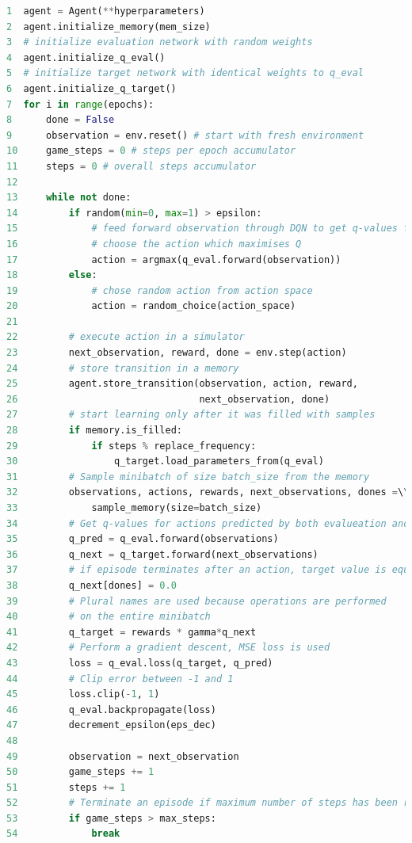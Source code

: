 \begin{lstlisting}[language=Python, caption={Main algorithm loop}]
1  agent = Agent(**hyperparameters)
2  agent.initialize_memory(mem_size)
3  # initialize evaluation network with random weights
4  agent.initialize_q_eval()
5  # initialize target network with identical weights to q_eval
6  agent.initialize_q_target()
7  for i in range(epochs):
8      done = False
9      observation = env.reset() # start with fresh environment
10     game_steps = 0 # steps per epoch accumulator
11     steps = 0 # overall steps accumulator
12        
13     while not done:
14         if random(min=0, max=1) > epsilon:
15             # feed forward observation through DQN to get q-values for each action
16             # choose the action which maximises Q
17             action = argmax(q_eval.forward(observation))
18         else:
19             # chose random action from action space
20             action = random_choice(action_space)
21            
22         # execute action in a simulator
23         next_observation, reward, done = env.step(action)
24         # store transition in a memory
25         agent.store_transition(observation, action, reward,
26                                next_observation, done)
27         # start learning only after it was filled with samples
28         if memory.is_filled:
29             if steps % replace_frequency:
30                 q_target.load_parameters_from(q_eval)
31         # Sample minibatch of size batch_size from the memory
32         observations, actions, rewards, next_observations, dones =\\
33             sample_memory(size=batch_size)
34         # Get q-values for actions predicted by both evalueation and target network
35         q_pred = q_eval.forward(observations)
36         q_next = q_target.forward(next_observations)
37         # if episode terminates after an action, target value is equal only to reward
38         q_next[dones] = 0.0
39         # Plural names are used because operations are performed 
40         # on the entire minibatch
41         q_target = rewards * gamma*q_next
42         # Perform a gradient descent, MSE loss is used
43         loss = q_eval.loss(q_target, q_pred)
44         # Clip error between -1 and 1
45         loss.clip(-1, 1)
46         q_eval.backpropagate(loss)
47         decrement_epsilon(eps_dec)
48              
49         observation = next_observation
50         game_steps += 1
51         steps += 1
52         # Terminate an episode if maximum number of steps has been reached
53         if game_steps > max_steps:
54             break
\end{lstlisting}

